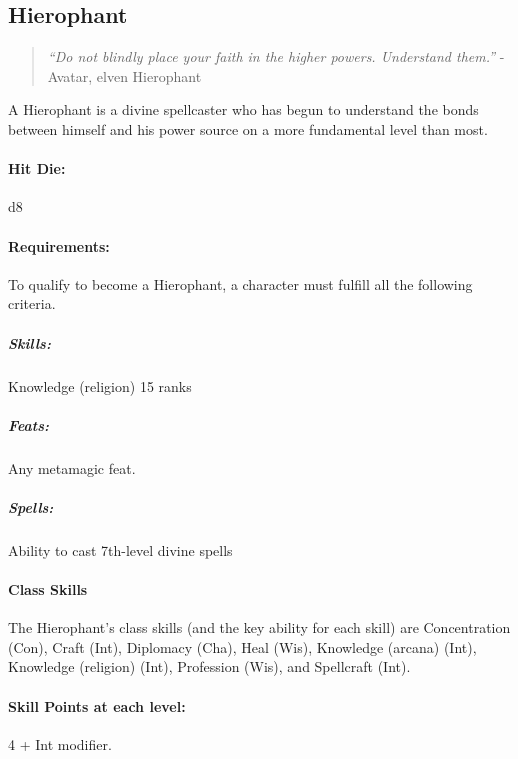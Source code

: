 \subsection{Hierophant}
\begin{quote}
\emph{``Do not blindly place your faith in the higher powers. Understand them.''}
- Avatar, elven Hierophant
\end{quote}
A Hierophant is a divine spellcaster who has begun to understand the bonds between himself and his power source on a more fundamental level than most.

\begin{table*}
\centering
\caption{The Hierophant}
\label{tab:Hierophant}
\end{table*}
\paragraph{Hit Die:} d8
\paragraph{Requirements:}
To qualify to become a Hierophant, a character must fulfill all the following criteria.
\subparagraph{Skills:} Knowledge (religion) 15 ranks 
\subparagraph{Feats:} Any metamagic feat.
\subparagraph{Spells:} Ability to cast 7th-level divine spells
\paragraph{Class Skills}
The Hierophant's class skills (and the key ability for each skill) are Concentration (Con), Craft (Int), Diplomacy (Cha), Heal (Wis), Knowledge (arcana) (Int), Knowledge (religion) (Int), Profession (Wis), and Spellcraft (Int).
\paragraph{Skill Points at each level:} 4 + Int modifier.

